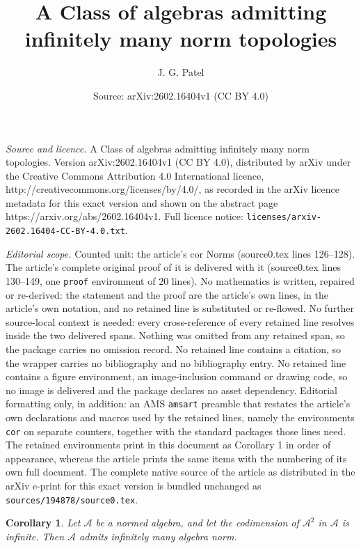 \documentclass[10pt,a4paper]{amsart}
\title{A Class of algebras admitting infinitely many norm topologies}
\author{J. G. Patel}
\date{Source: arXiv:2602.16404v1 (CC BY 4.0)}
\newtheorem{cor}{Corollary}
\begin{document}
\maketitle

\noindent\emph{Source and licence.} A Class of algebras admitting infinitely many norm topologies. Version arXiv:2602.16404v1 (CC BY 4.0), distributed by arXiv under the Creative Commons Attribution 4.0 International licence, http://creativecommons.org/licenses/by/4.0/, as recorded in the arXiv licence metadata for this exact version and shown on the abstract page https://arxiv.org/abs/2602.16404v1. Full licence notice: \texttt{licenses/arxiv-2602.16404-CC-BY-4.0.txt}.\par\smallskip

\noindent\textit{Editorial scope.} Counted unit: the article's cor Norms (source0.tex lines 126--128). The article's complete original proof of it is delivered with it (source0.tex lines 130--149, one \texttt{proof} environment of 20 lines). No mathematics is written, repaired or re-derived: the statement and the proof are the article's own lines, in the article's own notation, and no retained line is substituted or re-flowed.  No further source-local context is needed: every cross-reference of every retained line resolves inside the two delivered spans.  Nothing was omitted from any retained span, so the package carries no omission record.  No retained line contains a citation, so the wrapper carries no bibliography and no bibliography entry.  No retained line contains a figure environment, an image-inclusion command or drawing code, so no image is delivered and the package declares no asset dependency.  Editorial formatting only, in addition: an AMS \texttt{amsart} preamble that restates the article's own declarations and macros used by the retained lines, namely the environments \texttt{cor} on separate counters, together with the standard packages those lines need.  The retained environments print in this document as Corollary 1 in order of appearance, whereas the article prints the same items with the numbering of its own full document.  The complete native source of the article as distributed in the arXiv e-print for this exact version is bundled unchanged as \texttt{sources/194878/source0.tex}.
 \begin{cor}{\label{Infinitely Many Norms}}
 	Let $\mathcal{A}$ be a normed algebra, and let the codimension of $\mathcal{A}^2$ in  $\mathcal{A}$ is infinite. Then $\mathcal{A}$ admits infinitely many algebra norm.
 \end{cor}
\end{document}

